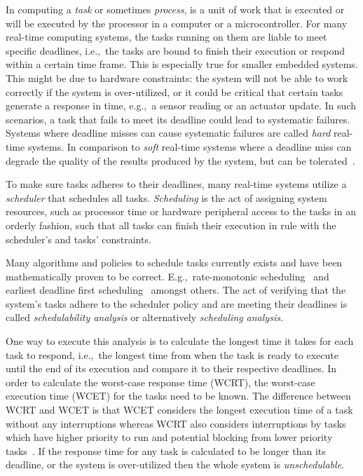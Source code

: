 In computing a \emph{task} or sometimes \emph{process}, is a unit of work that
is executed or will be executed by the processor in a computer or a
microcontroller.  For many real-time computing systems, the tasks running on
them are liable to meet specific deadlines, i.e.,\ the tasks are bound to finish
their execution or respond within a certain time frame. This is especially true
for smaller embedded systems. This might be due to hardware constraints: the
system will not be able to work correctly if the system is over-utilized, or it
could be critical that certain tasks generate a response in time, e.g.,\ a
sensor reading or an actuator update. In such scenarios, a task that fails to
meet its deadline could lead to systematic failures. Systems where deadline
misses can cause systematic failures are called \emph{hard} real-time systems.
In comparison to \emph{soft} real-time systems where a deadline miss can
degrade the quality of the results produced by the system, but can be
tolerated~\cite{hardrealtimecomputingsystems}.

To make sure tasks adheres to their deadlines, many real-time systems utilize
a \emph{scheduler} that schedules all tasks. \emph{Scheduling} is the act of
assigning system resources, such as processor time or hardware peripheral
access to the tasks in an orderly fashion, such that all tasks can finish their
execution in rule with the scheduler's and tasks' constraints.

Many algorithms and policies to schedule tasks currently exists and have been
mathematically proven to be correct.  E.g.,\ rate-monotonic
scheduling~\cite{ratemonotonic} and earliest deadline first scheduling~\cite{edf}
amongst others.  The act of verifying that the system's tasks adhere to the
scheduler policy and are meeting their deadlines is called \emph{schedulability
analysis} or alternatively \emph{scheduling analysis}.

One way to execute this analysis is to calculate the longest time it takes for
each task to respond, i.e.,\ the longest time from when the task is ready to
execute until the end of its execution and compare it to their respective
deadlines.  In order to calculate the worst-case response time (WCRT), the
worst-case execution time (WCET) for the tasks need to be known. The
difference between WCRT and WCET is that WCET considers the longest execution
time of a task without any interruptions whereas WCRT also considers
interruptions by tasks which have higher priority to
run and potential blocking from lower priority
tasks~\cite{hardrealtimecomputingsystems}. If the response time for any task is
calculated to be longer than its deadline, or the system is over-utilized then
the whole system is \emph{unschedulable}.

